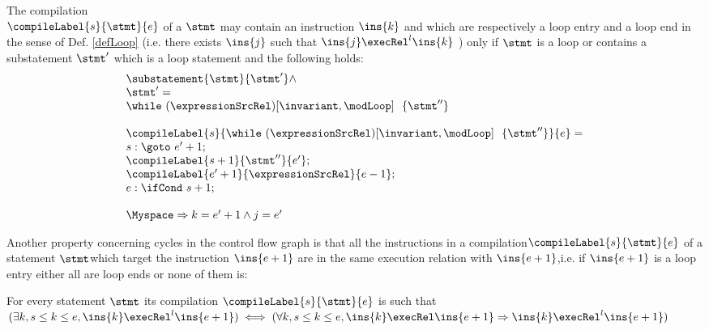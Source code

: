 \begin{compProp4}\label{compile:prop:compProp4}  %
The compilation \\ $\compileLabel{s}{\stmt}{e}$ of a $\stmt$ may contain an instruction $\ins{k}$ and   which are respectively 
a loop entry and a loop end  in the sense of Def.
\ref{defLoop} (i.e. there exists $\ins{j}$ such that $\ins{j} \execRel^{l} \ins{k}$ ) only if  $\stmt$ is a loop or contains 
 a substatement $\stmt'$ which is a loop statement and the following holds:
  $$\begin{array}{l}
                        \substatement{\stmt}{\stmt'} \wedge \\
			\stmt' = \\
                       \while \ (\expressionSrcRel) \lbrack \invariant, \modLoop \rbrack \ \do \ \{ \stmt'' \} \\ \\ 

                        \compileLabel{s}{   \while \ (\expressionSrcRel) \lbrack \invariant, \modLoop \rbrack \ \do \ \{ \stmt'' \}   }{e} = \\
			s: \goto \ e' + 1; \\
	                \compileLabel{s +  1}{\stmt''}{e'}; \\
			 \compileLabel{e' +  1}{\expressionSrcRel}{e  -1 };\\
			 e: \ifCond \ s +  1; \\  \\
                        \Myspace \Rightarrow k = e' +1 \wedge j = e'  
                
	           \end{array} 
               $$ 
	   
              
             

\end{compProp4}
 
Another property concerning cycles in the control flow graph is that all the instructions in a compilation$\compileLabel{s}{\stmt}{e}$   of a statement $\stmt 
$which target the instruction $\ins{e+1}$  are in the same execution relation with  $\ins{e+1}$,i.e. if  
$\ins{e+1}$ is a  loop entry either all are loop ends or none of them is:
\begin{compProp5}\label{compile:prop:compProp5} 
 For every statement $\stmt$ its compilation $\compileLabel{s}{\stmt}{e}$ is such that 
$(\exists k, s \le k \le e, \ins{k} \execRel^{l} \ins{e+1} ) \iff (\forall k, s \le k \le e, \ins{k} \execRel \ins{e+1}  \Rightarrow \ins{k} \execRel^{l} \ins{e+1} ) $
\end{compProp5}


